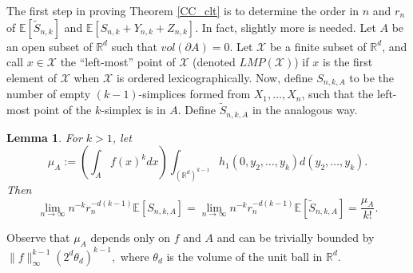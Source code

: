\documentclass{amsart}
\newtheorem{lemma}[thm]{Lemma}
\theoremstyle{definition}
\newcommand{\R}{\mathbb{R}}
\newcommand{\E}{\mathbb{E}}
\newcommand{\X}{\mathcal{X}}
\newcommand{\s}{\widetilde{S}}
\renewcommand{\1}{\mathbb{1}}
\begin{document}
The first step in proving Theorem
\ref{CC_clt} is to determine the order in $n$ and $r_n$ of
$\E[\s_{n,k}]$ and $\E[S_{n,k}+Y_{n,k}+Z_{n,k}]$.  In fact, slightly more is needed.   Let $A$ be an open subset of $\R^d$
such that $vol(\partial A)=0$.  Let $\X$ be a finite subset of $\R^d$,
and call $x\in\X$ the ``left-most'' point of $\X$ (denoted $LMP(\X)$)
if $x$ is the first element of $\X$ when $\X$ is ordered
lexicographically.  Now, define $S_{n,k,A}$ to be the number of empty
$( k-1)$-simplices formed from $X_1,\ldots,X_n$, such that
the left-most point of the $k$-simplex is in $A$.  Define $\s_{n,k,A}$
in the analogous way.

\begin{lemma}\label{exp-order}
For $k>1$, let $$\mu_A:=\left(\int_{A}f(x)^kdx\right)\int_{(\R^d)^{k-1}}h_1(0,y_2,\ldots,y_k)
d(y_2,\ldots,y_k).$$
Then 
$$\lim_{n\to\infty}n^{-k}r_n^{-d(k-1)}\E\left[S_{n,k,A}\right]=
\lim_{n\to\infty}n^{-k}r_n^{-d(k-1)}\E[\s_{n,k,A}]=\frac{\mu_A}{k!}.$$
\end{lemma}
Observe that $\mu_A$ depends only on $f$  and $A$ 
and can be trivially bounded by
$\|f\|_\infty^{k-1}(2^d\theta_d)^{k-1},$ where $\theta_d$ is the volume of the
unit ball in $\R^d$.  
\end{document}

